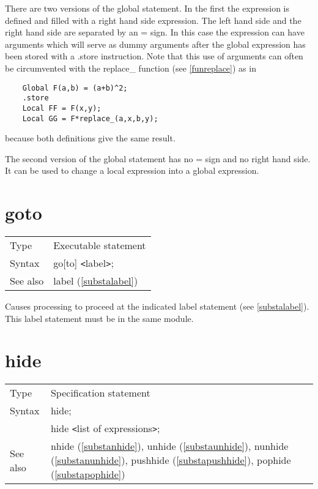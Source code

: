 \noindent There are two versions of the global statement. In the first the 
expression is defined and filled with a right hand side expression. The left 
hand side and the right hand side are separated by an = sign. In this case 
the expression can have arguments which will serve as
dummy arguments after the global expression has been 
stored with a .store instruction. Note that this use of arguments can often 
be circumvented with the replace\_ function (see \ref{funreplace}) as in
\begin{verbatim}
    Global F(a,b) = (a+b)^2;
    .store
    Local FF = F(x,y);
    Local GG = F*replace_(a,x,b,y);
\end{verbatim}
because both definitions give the same result.

\noindent The second version of the global statement has no = sign and no 
right hand side. It can be used to change a local expression 
into a global expression. \vspace{10mm}


\section{goto}
\label{substagoto}

\noindent \begin{tabular}{ll}
Type & Executable statement\\
Syntax & go[to] {\tt<}label{\tt>}; \\
See also & label (\ref{substalabel})
\end{tabular} \vspace{4mm}

\noindent Causes processing to proceed at the indicated 
label statement 
(see \ref{substalabel}). This label statement must be in the same module. 
\vspace{10mm}


\section{hide}
\label{substahide}

\noindent \begin{tabular}{ll}
Type & Specification statement\\
Syntax & hide; \\
       & hide {\tt<}list of expressions{\tt>};
\\ See also & nhide (\ref{substanhide}),
              unhide (\ref{substaunhide}),
              nunhide (\ref{substanunhide}),
              pushhide (\ref{substapushhide}),
              pophide (\ref{substapophide})
\end{tabular} \vspace{4mm}

